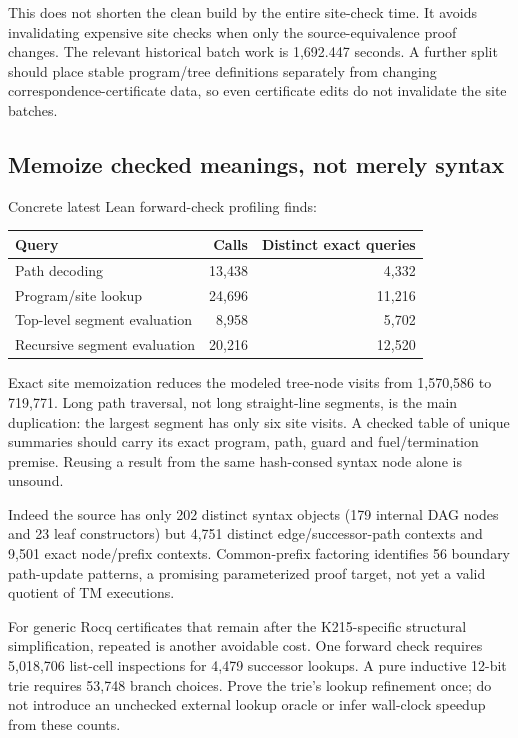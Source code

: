 \documentclass[11pt]{article}
\newcommand{\file}[1]{{\small\path{#1}}}
\begin{document}
This does not shorten the clean build by the entire site-check time. It avoids invalidating expensive site checks when only the source-equivalence proof changes. The relevant historical batch work is 1,692.447 seconds. A further split should place stable program/tree definitions separately from changing correspondence-certificate data, so even certificate edits do not invalidate the site batches.

\subsection{Memoize checked meanings, not merely syntax}
Concrete latest Lean forward-check profiling finds:
\begin{center}\small
\begin{tabular}{lrr}
\toprule
Query & Calls & Distinct exact queries\\\midrule
Path decoding & 13,438 & 4,332\\
Program/site lookup & 24,696 & 11,216\\
Top-level segment evaluation & 8,958 & 5,702\\
Recursive segment evaluation & 20,216 & 12,520\\
\bottomrule
\end{tabular}
\end{center}
Exact site memoization reduces the modeled tree-node visits from 1,570,586 to 719,771. Long path traversal, not long straight-line segments, is the main duplication: the largest segment has only six site visits. A checked table of unique summaries should carry its exact program, path, guard and fuel/termination premise. Reusing a result from the same hash-consed syntax node alone is unsound.

Indeed the source has only 202 distinct syntax objects (179 internal DAG nodes and 23 leaf constructors) but 4,751 distinct edge/successor-path contexts and 9,501 exact node/prefix contexts. Common-prefix factoring identifies 56 boundary path-update patterns, a promising parameterized proof target, not yet a valid quotient of TM executions.

For generic Rocq certificates that remain after the K215-specific structural simplification, repeated \file{nth_error} is another avoidable cost. One forward check requires 5,018,706 list-cell inspections for 4,479 successor lookups. A pure inductive 12-bit trie requires 53,748 branch choices. Prove the trie's lookup refinement once; do not introduce an unchecked external lookup oracle or infer wall-clock speedup from these counts.
\end{document}
